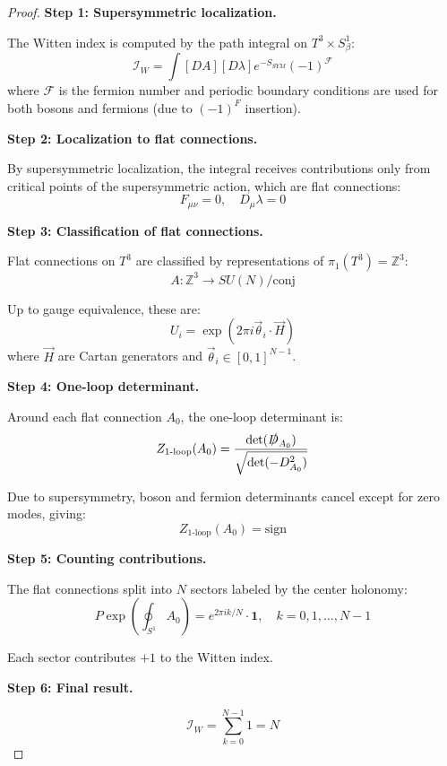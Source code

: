 \begin{proof}
\textbf{Step 1: Supersymmetric localization.}

The Witten index is computed by the path integral on $T^3 \times S^1_\beta$:
\begin{equation}
\mathcal{I}_W = \int [DA][D\lambda] e^{-S_{SYM}} (-1)^{\mathcal{F}}
\end{equation}
where $\mathcal{F}$ is the fermion number and periodic boundary conditions 
are used for both bosons and fermions (due to $(-1)^F$ insertion).

\textbf{Step 2: Localization to flat connections.}

By supersymmetric localization, the integral receives contributions only from 
critical points of the supersymmetric action, which are flat connections:
\begin{equation}
F_{\mu\nu} = 0, \quad D_\mu \lambda = 0
\end{equation}

\textbf{Step 3: Classification of flat connections.}

Flat connections on $T^3$ are classified by representations of $\pi_1(T^3) = \mathbb{Z}^3$:
\begin{equation}
A : \mathbb{Z}^3 \to SU(N)/\text{conj}
\end{equation}

Up to gauge equivalence, these are:
\begin{equation}
U_i = \exp(2\pi i \vec{\theta}_i \cdot \vec{H})
\end{equation}
where $\vec{H}$ are Cartan generators and $\vec{\theta}_i \in [0,1]^{N-1}$.

\textbf{Step 4: One-loop determinant.}

Around each flat connection $A_0$, the one-loop determinant is:
\begin{equation}
Z_{\text{1-loop}}(A_0) = \frac{\det(\slashed{D}_{A_0})}{\sqrt{\det(-D_{A_0}^2)}}
\end{equation}

Due to supersymmetry, boson and fermion determinants cancel except for 
zero modes, giving:
\begin{equation}
Z_{\text{1-loop}}(A_0) = \text{sign}
\end{equation}

\textbf{Step 5: Counting contributions.}

The flat connections split into $N$ sectors labeled by the center holonomy:
\begin{equation}
P \exp\left(\oint_{S^1} A_0\right) = e^{2\pi i k/N} \cdot \mathbf{1}, \quad k = 0, 1, \ldots, N-1
\end{equation}

Each sector contributes $+1$ to the Witten index.

\textbf{Step 6: Final result.}

\begin{equation}
\mathcal{I}_W = \sum_{k=0}^{N-1} 1 = N
\end{equation}
\end{proof}

